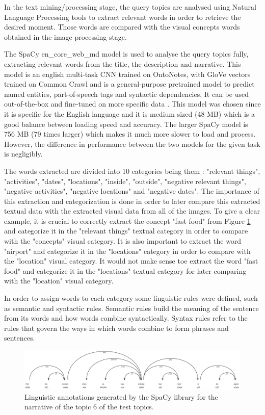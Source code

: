 In the text mining/processing stage, the query topics are analysed using Natural Language Processing tools to extract relevant words in order to retrieve the desired moment. Those words are compared with the visual concepts words obtained in the image processing stage. 

The SpaCy en\_core\_web\_md model \cite{Spacy2017} is used to analyse the query topics fully, extracting relevant words from the title, the description and narrative. This model is an english multi-task CNN trained on OntoNotes, with GloVe vectors trained on Common Crawl and is a general-purpose pretrained model to predict named entities, part-of-speech tags and syntactic dependencies. It can be used out-of-the-box and fine-tuned on more specific data \cite{Spacy2017}. This model was chosen since it is specific for the English language and it is medium sized (48 MB) which is a good balance between loading speed and accuracy. The larger SpaCy model is 756 MB (79 times larger) which makes it much more slower to load and process. However, the difference in performance between the two models for the given task is negligibly.




The words extracted are divided into 10 categories being them : "relevant things", "activities", "dates", "locations", "inside", "outside", "negative relevant things", "negative activities", "negative locations" and "negative dates". The importance of this extraction and categorization is done in order to later compare this extracted textual data with the extracted visual data from all of the images. To give a clear example, it is crucial to correctly extract the concept "fast food" from Figure \ref{fig:spacy_labels} and categorize it in the "relevant things" textual category in order to compare with the "concepts" visual category. It is also important to extract the word "airport" and categorize it in the "locations" category in order to compare with the "location" visual category. It would not make sense toe extract the word "fast food" and categorize it in the "locations" textual category for later comparing with the "location" visual category.

In order to assign words to each category some linguistic rules were defined,
such as semantic and syntactic rules. Semantic rules build the meaning of the
sentence from its words and how words combine syntactically. Syntax rules refer to
the rules that govern the ways in which words combine to form phrases and
sentences. 

\begin{figure}[H]
    \centering
    \captionsetup{justification=centering}
    \includegraphics[width =  \textwidth]{Sections/6textprocessing/images/spacy.png}
    \caption[SpaCy linguistic annotations generated]{Linguistic annotations generated by the SpaCy library \cite{Spacy2017} for the narrative of the topic 6 of the test topics.}
    \label{fig:spacy_labels}
  \end{figure}

